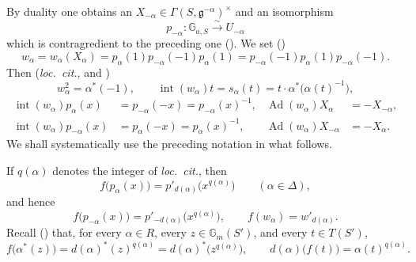By duality one obtains an
\(X_{-\alpha}\in\Gamma(S,\mathfrak g^{-\alpha})^\times\) and an
isomorphism
\[
  p_{-\alpha}:\mathbb G_{a,S}\xrightarrow{\ \sim\ }U_{-\alpha}
\]
which is contragredient to the preceding one (). We
set ()
\[
  w_\alpha=w_\alpha(X_\alpha)
  =p_\alpha(1)p_{-\alpha}(-1)p_\alpha(1)
  =p_{-\alpha}(-1)p_\alpha(1)p_{-\alpha}(-1).
\]
Then (\textit{loc.\ cit.},  and )
\[
  w_\alpha^2=\alpha^\ast(-1),\qquad
  \operatorname{int}(w_\alpha)t
    =s_\alpha(t)=t\cdot\alpha^\ast\!\bigl(\alpha(t)^{-1}\bigr),
\]
\[
\begin{aligned}
  \operatorname{int}(w_\alpha)p_\alpha(x)
    &=p_{-\alpha}(-x)=p_{-\alpha}(x)^{-1},&
  \operatorname{Ad}(w_\alpha)X_\alpha&=-X_{-\alpha},\\
  \operatorname{int}(w_\alpha)p_{-\alpha}(x)
    &=p_\alpha(-x)=p_\alpha(x)^{-1},&
  \operatorname{Ad}(w_\alpha)X_{-\alpha}&=-X_\alpha .
\end{aligned}
\]
We shall systematically use the preceding notation in what follows.



If \(q(\alpha)\) denotes the integer of \textit{loc.\ cit.}, then
\[
  f\bigl(p_\alpha(x)\bigr)
    =p'_{d(\alpha)}\bigl(x^{q(\alpha)}\bigr)
    \qquad (\alpha\in\Delta),
\]
and hence
\[
  f\bigl(p_{-\alpha}(x)\bigr)
    =p'_{-d(\alpha)}\bigl(x^{q(\alpha)}\bigr),
  \qquad
  f(w_\alpha)=w'_{d(\alpha)} .
\]
Recall () that, for every \(\alpha\in R\), every
\(z\in\mathbb G_m(S')\), and every \(t\in T(S')\),
\[
  f\bigl(\alpha^\ast(z)\bigr)
    =d(\alpha)^\ast(z)^{q(\alpha)}
    =d(\alpha)^\ast\bigl(z^{q(\alpha)}\bigr),
  \qquad
  d(\alpha)\bigl(f(t)\bigr)=\alpha(t)^{q(\alpha)} .
\]

